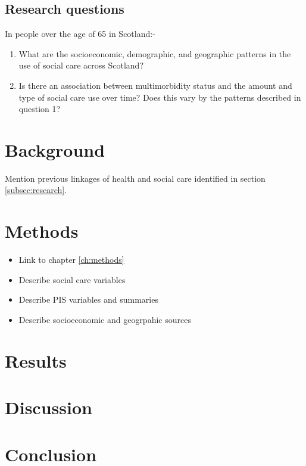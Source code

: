 \documentclass[12pt,]{report}
\begin{document}
\subsection{Research questions}\label{subsec:social-care-rqs}

In people over the age of 65 in Scotland:-

\begin{enumerate}[noitemsep]
\item   What are the socioeconomic, demographic, and geographic patterns in the use of social care across Scotland? 
\item Is there an association between multimorbidity status and the amount and type of social care use over time? Does this vary by the patterns described in question 1?
\end{enumerate}

\section{Background}\label{sec:social-care-background}

Mention previous linkages of health and social care identified in
section \ref{subsec:research}.

\section{Methods}\label{sec:social-care-methods}

\begin{itemize}[noitemsep]
\item Link to chapter \ref{ch:methods}
\item Describe social care variables
\item Describe PIS variables and summaries
\item Describe socioeconomic and geogrpahic sources
\end{itemize}

\section{Results}\label{sec:social-care-results}

\section{Discussion}\label{sec:social-care-discuss}

\section{Conclusion}\label{sec:social-care-conclu}
\end{document}
